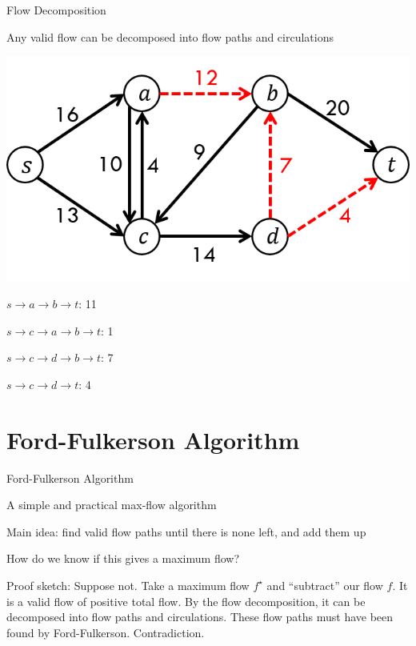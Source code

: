 \documentclass[13pt,onlymath]{beamer}
\begin{document}
\begin{frame}{Flow Decomposition}
\BIT
\item Any valid flow can be decomposed into flow paths and circulations
\begin{center}
\includegraphics[height=0.3\textheight]{figures/mincut_example}
\end{center}
\BIT
\item $s \rightarrow a \rightarrow b \rightarrow t$: 11
\item $s \rightarrow c \rightarrow a \rightarrow b \rightarrow t$: 1
\item $s \rightarrow c \rightarrow d \rightarrow b \rightarrow t$: 7
\item $s \rightarrow c \rightarrow d \rightarrow t$: 4
\EIT \EIT
\end{frame}

\section{Ford-Fulkerson Algorithm}

\begin{frame}{Ford-Fulkerson Algorithm}
\BIT
\item A simple and practical max-flow algorithm
\item Main idea: find valid flow paths until there is none left, and add them up
\item How do we know if this gives a maximum flow?
\BIT
\item Proof sketch: Suppose not. Take a maximum flow $f^\star$ and ``subtract'' our flow $f$. It is a valid flow of positive total flow. By the flow decomposition, it can be decomposed into flow paths and circulations. These flow paths must have been found by Ford-Fulkerson. Contradiction.
\EIT \EIT
\end{frame}
\end{document}
